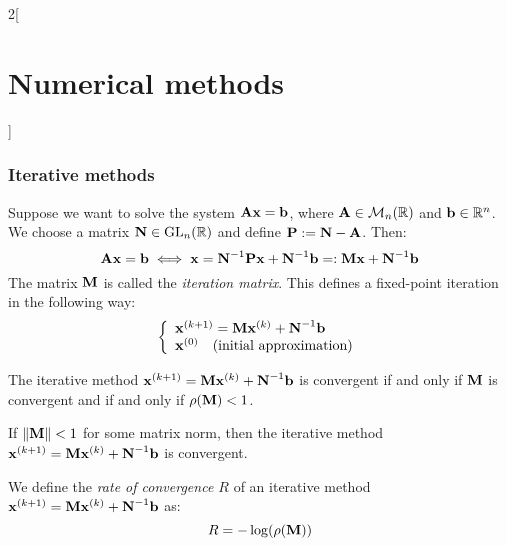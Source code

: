 \documentclass[../../../main.tex]{subfiles}
\begin{document}
\begin{multicols}{2}[\section{Numerical methods}]
    \subsubsection*{Iterative methods}
    \begin{definition}
        Suppose we want to solve the system $\boldsymbol{\mathrm{A}}\boldsymbol{\mathrm{x}}=\boldsymbol{\mathrm{b}}$, where $\boldsymbol{\mathrm{A}}\in\mathcal{M}_n(\mathbb{R})$ and $\boldsymbol{\mathrm{b}}\in\mathbb{R}^n$. We choose a matrix $\boldsymbol{\mathrm{N}}\in\mathrm{GL}_n(\mathbb{R})$ and define $\boldsymbol{\mathrm{P}}:=\boldsymbol{\mathrm{N}}-\boldsymbol{\mathrm{A}}$. Then: $$\boldsymbol{\mathrm{A}}\boldsymbol{\mathrm{x}}=\boldsymbol{\mathrm{b}}\iff \boldsymbol{\mathrm{x}}=\boldsymbol{\mathrm{N}}^{-1}\boldsymbol{\mathrm{P}}\boldsymbol{\mathrm{x}}+\boldsymbol{\mathrm{N}}^{-1}\boldsymbol{\mathrm{b}}=:\boldsymbol{\mathrm{M}}\boldsymbol{\mathrm{x}}+\boldsymbol{\mathrm{N}}^{-1}\boldsymbol{\mathrm{b}}$$ The matrix $\boldsymbol{\mathrm{M}}$ is called the \textit{iteration matrix}. This defines a fixed-point iteration in the following way:
        \begin{equation*}
            \left\{
            \begin{array}{l}
                \boldsymbol{\mathrm{x}}^{(k+1)}=\boldsymbol{\mathrm{M}}\boldsymbol{\mathrm{x}}^{(k)}+\boldsymbol{\mathrm{N}}^{-1}\boldsymbol{\mathrm{b}} \\
                \boldsymbol{\mathrm{x}}^{(0)}\quad\text{(initial approximation)}
            \end{array}\right.
        \end{equation*}
    \end{definition}
    \begin{theorem}
        The iterative method $\boldsymbol{\mathrm{x}}^{(k+1)}=\boldsymbol{\mathrm{M}}\boldsymbol{\mathrm{x}}^{(k)}+\boldsymbol{\mathrm{N}}^{-1}\boldsymbol{\mathrm{b}}$ is convergent if and only if $\boldsymbol{\mathrm{M}}$ is convergent and if and only if $\rho(\boldsymbol{\mathrm{M}})<1$.
    \end{theorem}
    \begin{corollary}
        If $\|\boldsymbol{\mathrm{M}}\|<1$ for some matrix norm, then the iterative method $\boldsymbol{\mathrm{x}}^{(k+1)}=\boldsymbol{\mathrm{M}}\boldsymbol{\mathrm{x}}^{(k)}+\boldsymbol{\mathrm{N}}^{-1}\boldsymbol{\mathrm{b}}$ is convergent.
    \end{corollary}
    \begin{definition}
        We define the \textit{rate of convergence $R$} of an iterative method $\boldsymbol{\mathrm{x}}^{(k+1)}=\boldsymbol{\mathrm{M}}\boldsymbol{\mathrm{x}}^{(k)}+\boldsymbol{\mathrm{N}}^{-1}\boldsymbol{\mathrm{b}}$ as: $$R=-\log(\rho(\boldsymbol{\mathrm{M}}))$$
    \end{definition}

\end{multicols}
\end{document}
